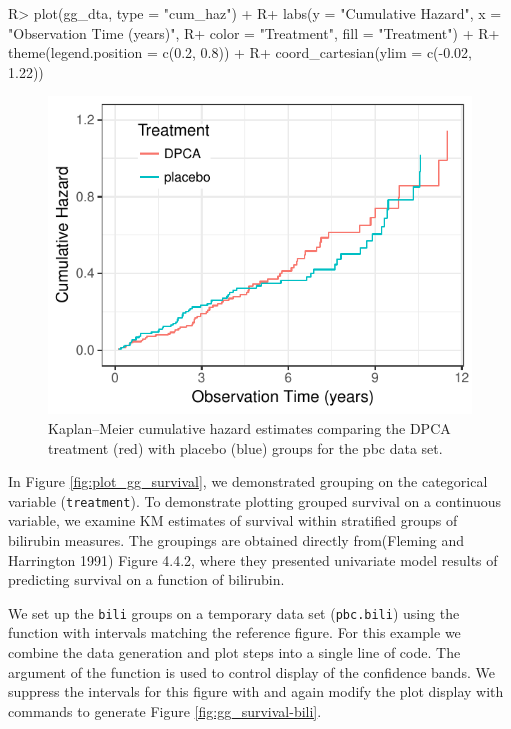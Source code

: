 \documentclass[article]{jss}
\begin{document}
\begin{Schunk}
\begin{Sinput}
R> plot(gg_dta, type = "cum_haz") +
R+   labs(y = "Cumulative Hazard", x = "Observation Time (years)",
R+        color = "Treatment", fill = "Treatment") +
R+   theme(legend.position = c(0.2, 0.8)) +
R+   coord_cartesian(ylim = c(-0.02, 1.22))
\end{Sinput}
\begin{figure}[!htb]

{\centering \includegraphics{fig-rfs/rfs-plot_gg_cum_hazard-1} 

}

\caption[Kaplan--Meier cumulative hazard estimates comparing the DPCA treatment (red) with placebo (blue) groups for the pbc data set]{Kaplan--Meier cumulative hazard estimates comparing the DPCA treatment (red) with placebo (blue) groups for the pbc data set.}\label{fig:plot_gg_cum_hazard}
\end{figure}
\end{Schunk}

In Figure \ref{fig:plot_gg_survival}, we demonstrated grouping on the
categorical variable (\texttt{treatment}). To demonstrate plotting
grouped survival on a continuous variable, we examine KM estimates of
survival within stratified groups of bilirubin measures. The groupings
are obtained directly from(Fleming and Harrington 1991) Figure 4.4.2,
where they presented univariate model results of predicting survival on
a function of bilirubin.

We set up the \texttt{bili} groups on a temporary data set
(\texttt{pbc.bili}) using the  function with intervals
matching the reference figure. For this example we combine the data
generation and plot steps into a single line of code. The 
argument of the  function is used to control
display of the confidence bands. We suppress the intervals for this
figure with  and again modify the plot display with
 commands to generate Figure \ref{fig:gg_survival-bili}.
\end{document}
